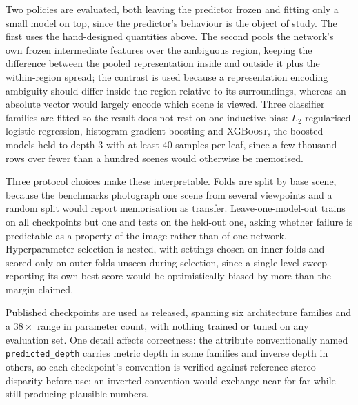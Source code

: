 Two policies are evaluated, both leaving the predictor frozen and fitting only a
small model on top, since the predictor's behaviour is the object of study. The
first uses the hand-designed quantities above. The second pools the network's own
frozen intermediate features over the ambiguous region, keeping the difference
between the pooled representation inside and outside it plus the within-region
spread; the contrast is used because a representation encoding ambiguity should
differ inside the region relative to its surroundings, whereas an absolute vector
would largely encode which scene is viewed. Three classifier families are fitted so
the result does not rest on one inductive bias: $L_2$-regularised logistic
regression, histogram gradient boosting and \textsc{XGBoost}, the boosted models
held to depth $3$ with at least $40$ samples per leaf, since a few thousand rows
over fewer than a hundred scenes would otherwise be memorised.

Three protocol choices make these interpretable. Folds are split by base scene,
because the benchmarks photograph one scene from several viewpoints and a random
split would report memorisation as transfer. Leave-one-model-out trains on all
checkpoints but one and tests on the held-out one, asking whether failure is
predictable as a property of the image rather than of one network. Hyperparameter
selection is nested, with settings chosen on inner folds and scored only on outer
folds unseen during selection, since a single-level sweep reporting its own best
score would be optimistically biased by more than the margin claimed.

Published checkpoints are used as released, spanning six architecture families and
a $38\times$ range in parameter count, with nothing trained or tuned on any
evaluation set. One detail affects correctness: the attribute conventionally named
\texttt{predicted\_depth} carries metric depth in some families and inverse depth
in others, so each checkpoint's convention is verified against reference stereo
disparity before use; an inverted convention would exchange near for far while
still producing plausible numbers.
